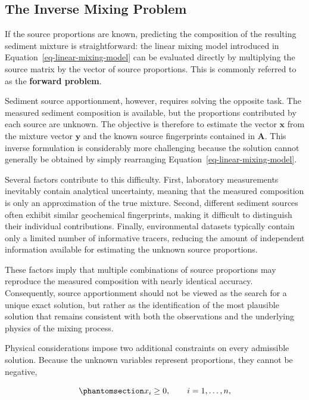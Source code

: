 \documentclass[
  12pt,
  letterpaper,
]{book}
\begin{document}
\subsection{The Inverse Mixing
Problem}\label{the-inverse-mixing-problem}

If the source proportions are known, predicting the composition of the
resulting sediment mixture is straightforward: the linear mixing model
introduced in Equation~\ref{eq-linear-mixing-model} can be evaluated
directly by multiplying the source matrix by the vector of source
proportions. This is commonly referred to as the \textbf{forward
problem}.

Sediment source apportionment, however, requires solving the opposite
task. The measured sediment composition is available, but the
proportions contributed by each source are unknown. The objective is
therefore to estimate the vector \(\mathbf{x}\) from the mixture vector
\(\mathbf{y}\) and the known source fingerprints contained in
\(\mathbf{A}\). This inverse formulation is considerably more
challenging because the solution cannot generally be obtained by simply
rearranging Equation~\ref{eq-linear-mixing-model}.

Several factors contribute to this difficulty. First, laboratory
measurements inevitably contain analytical uncertainty, meaning that the
measured composition is only an approximation of the true mixture.
Second, different sediment sources often exhibit similar geochemical
fingerprints, making it difficult to distinguish their individual
contributions. Finally, environmental datasets typically contain only a
limited number of informative tracers, reducing the amount of
independent information available for estimating the unknown source
proportions.

These factors imply that multiple combinations of source proportions may
reproduce the measured composition with nearly identical accuracy.
Consequently, source apportionment should not be viewed as the search
for a unique exact solution, but rather as the identification of the
most plausible solution that remains consistent with both the
observations and the underlying physics of the mixing process.

Physical considerations impose two additional constraints on every
admissible solution. Because the unknown variables represent
proportions, they cannot be negative,

\begin{equation}\phantomsection\label{eq-nonnegative}{
x_i \ge 0,
\qquad i=1,\ldots,n,
}\end{equation}
\end{document}
